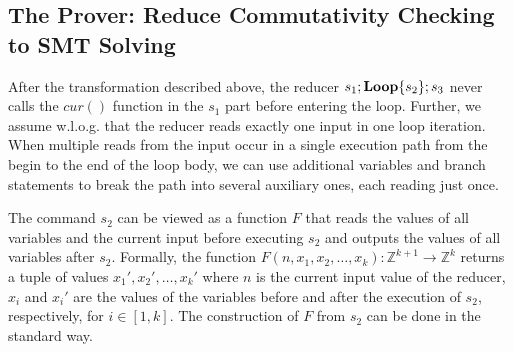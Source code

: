 \documentclass{llncs}
\newcommand{\cur}{cur()}
\newcommand{\rloop}{
	\ifmmode
	\mathbf{Loop}
	\else
	\textbf{Loop}
	\fi}
\newcommand{\Z}{\mathbb{Z}}
\begin{document}

\vspace{-2mm}
\subsection{The Prover: Reduce Commutativity Checking to SMT Solving}
\vspace{-2mm}
\label{sec:prover}

After the transformation described above, the reducer $s_1;\rloop\{s_2\};s_3$
never calls the $\cur$ function in the $s_1$ part before entering the loop.
Further, we assume w.l.o.g. that the reducer reads exactly one input in one loop
iteration. When multiple reads from the input occur in a single execution path from the begin to the end of
the loop body, we can use additional variables and branch statements to break the path into several
auxiliary ones, each reading just once.

The command $s_2$
can be viewed as a function $F$ that reads the values of all variables and the
current input before executing $s_2$ and outputs the values of all variables
after $s_2$. Formally, the function $F(n,x_1,x_2,\ldots,x_k): \Z^{k+1}
\rightarrow \Z^k$ returns a tuple of values $x_1',x_2',\ldots,x_k'$ where $n$ is
the current input value of the reducer, $x_i$ and $x_i'$ are the values of the
variables before and after the execution of $s_2$, respectively, for
$i\in[1,k]$. The construction of $F$ from $s_2$ can be done in the standard way.
\end{document}
